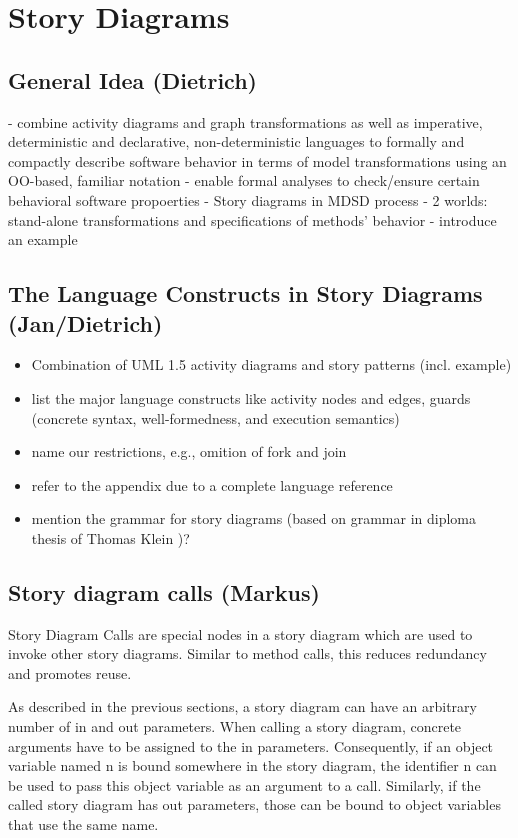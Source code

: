\section{Story Diagrams} \label{sec:StoryDiagrams}

\subsection{General Idea (Dietrich)}

- combine activity diagrams and graph transformations as well as imperative, deterministic and declarative, non-deterministic languages to formally and compactly describe software behavior in terms of model transformations using an OO-based, familiar notation
- enable formal analyses to check/ensure certain behavioral software propoerties
- Story diagrams in MDSD process
- 2 worlds: stand-alone transformations and specifications of methods' behavior
- introduce an example


\subsection{The Language Constructs in Story Diagrams (Jan/Dietrich)}\label{sec:StoryDiagrams:composition}

\begin{itemize}
  \item Combination of UML 1.5 activity diagrams and story patterns (incl. example)
  \item list the major language constructs like activity nodes and edges, guards (concrete syntax, well-formedness, and execution semantics)
  \item name our restrictions, e.g., omition of fork and join
  \item refer to the appendix due to a complete language reference
  \item mention the grammar for story diagrams (based on grammar in diploma thesis of Thomas Klein \cite{Kle99})?
\end{itemize}

\subsection{Story diagram calls (Markus)}

Story Diagram Calls are special nodes in a story diagram which are used to invoke other story diagrams. Similar to method calls, this reduces redundancy and promotes reuse.

As described in the previous sections, a story diagram can have an arbitrary number of in and out parameters. When calling a story diagram, concrete arguments have to be assigned to the in parameters. Consequently, if an object variable named n is bound somewhere in the story diagram, the identifier n can be used to pass this object variable as an argument to a call. Similarly, if the called story diagram has out parameters, those can be bound to object variables that use the same name.

